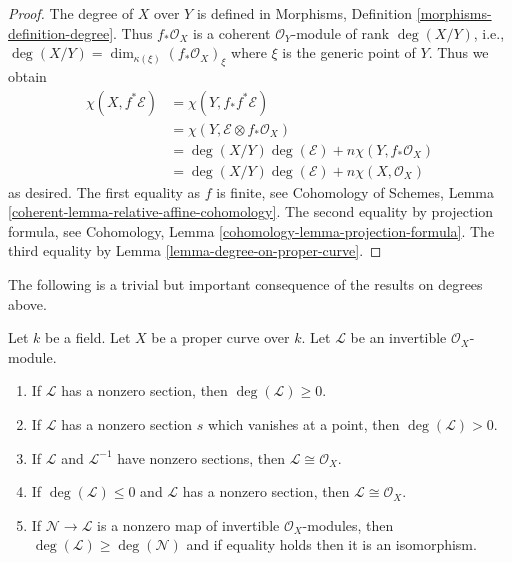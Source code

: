 \begin{proof}
The degree of $X$ over $Y$ is defined in
Morphisms, Definition \ref{morphisms-definition-degree}.
Thus $f_*\mathcal{O}_X$ is a coherent $\mathcal{O}_Y$-module
of rank $\deg(X/Y)$, i.e.,
$\deg(X/Y) = \dim_{\kappa(\xi)} (f_*\mathcal{O}_X)_\xi$ where $\xi$
is the generic point of $Y$. Thus we obtain
\begin{align*}
\chi(X, f^*\mathcal{E})
& =
\chi(Y, f_*f^*\mathcal{E}) \\
& =
\chi(Y, \mathcal{E} \otimes f_*\mathcal{O}_X) \\
& =
\deg(X/Y) \deg(\mathcal{E}) + n \chi(Y, f_*\mathcal{O}_X) \\
& =
\deg(X/Y) \deg(\mathcal{E}) + n \chi(X, \mathcal{O}_X)
\end{align*}
as desired. The first equality as $f$ is finite, see
Cohomology of Schemes, Lemma \ref{coherent-lemma-relative-affine-cohomology}.
The second equality by projection formula, see
Cohomology, Lemma \ref{cohomology-lemma-projection-formula}.
The third equality by Lemma \ref{lemma-degree-on-proper-curve}.
\end{proof}

\noindent
The following is a trivial but important consequence of the
results on degrees above.

\begin{lemma}
\label{lemma-check-invertible-sheaf-trivial}
Let $k$ be a field. Let $X$ be a proper curve over $k$.
Let $\mathcal{L}$ be an invertible $\mathcal{O}_X$-module.
\begin{enumerate}
\item If $\mathcal{L}$ has a nonzero section, then
$\deg(\mathcal{L}) \geq 0$.
\item If $\mathcal{L}$ has a nonzero section $s$ which vanishes
at a point, then $\deg(\mathcal{L}) > 0$.
\item If $\mathcal{L}$ and $\mathcal{L}^{-1}$ have nonzero sections, then
$\mathcal{L} \cong \mathcal{O}_X$.
\item If $\deg(\mathcal{L}) \leq 0$ and $\mathcal{L}$ has a nonzero
section, then $\mathcal{L} \cong \mathcal{O}_X$.
\item If $\mathcal{N} \to \mathcal{L}$ is a nonzero map of invertible
$\mathcal{O}_X$-modules, then $\deg(\mathcal{L}) \geq \deg(\mathcal{N})$
and if equality holds then it is an isomorphism.
\end{enumerate}
\end{lemma}

